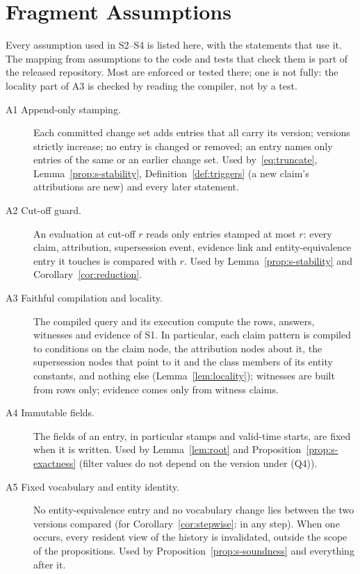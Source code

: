\section{Fragment Assumptions}\label{sec:s-assumptions}

Every assumption used in S2--S4 is listed here, with the statements that use it. The mapping from
assumptions to the code and tests that check them is part of the released repository. Most are
enforced or tested there; one is not fully: the locality part of A3 is checked by reading the
compiler, not by a test.

\begin{description}
\item[A1 Append-only stamping.] Each committed change set adds entries that all carry its version;
  versions strictly increase; no entry is changed or removed; an entry names only entries of the
  same or an earlier change set. Used by~\eqref{eq:truncate}, Lemma~\ref{prop:s-stability},
  Definition~\ref{def:triggers} (a new claim's attributions are new) and every later statement.
\item[A2 Cut-off guard.] An evaluation at cut-off $r$ reads only entries stamped at most $r$: every
  claim, attribution, supersession event, evidence link and entity-equivalence entry it touches is
  compared with $r$. Used by Lemma~\ref{prop:s-stability} and Corollary~\ref{cor:reduction}.
\item[A3 Faithful compilation and locality.] The compiled query and its execution compute the rows,
  answers, witnesses and evidence of S1. In particular, each claim pattern is compiled to conditions
  on the claim node, the attribution nodes about it, the supersession nodes that point to it and
  the class members of its entity constants, and nothing else (Lemma~\ref{lem:locality}); witnesses
  are built from rows only; evidence comes only from witness claims.
\item[A4 Immutable fields.] The fields of an entry, in particular stamps and valid-time starts, are
  fixed when it is written. Used by Lemma~\ref{lem:root} and Proposition~\ref{prop:s-exactness}
  (filter values do not depend on the version under (Q4)).
\item[A5 Fixed vocabulary and entity identity.] No entity-equivalence entry and no vocabulary
  change lies between the two versions compared (for Corollary~\ref{cor:stepwise}: in any step).
  When one occurs, every resident view of the history is invalidated, outside the scope of the
  propositions. Used by Proposition~\ref{prop:s-soundness} and everything after it.

\end{description}
